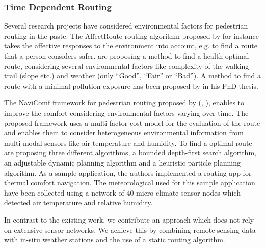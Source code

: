 \subsubsection{Time Dependent Routing}
Several research projects have considered environmental factors for pedestrian routing in the paste. The AffectRoute routing algorithm proposed by \textcite{Huang2014} for instance takes the affective responses to the environment into account, e.g. to find a route that a person considers safer.  \textcite{Sharker2012} are proposing a method to find a health optimal route, considering several environmental factors like complexity of the walking trail (slope etc.) and weather (only “Good”, “Fair” or “Bad”). A method to find a route with a minimal pollution exposure has been proposed by \textcite{Hasenfratz2015} in his PhD thesis.

The NaviComf framework for pedestrian routing proposed by \citeauthor{Dang2012} (\citeyear{Dang2012}, \citeyear{Dang2013}), enables to improve the comfort considering environmental factors varying over time. The proposed framework uses a multi-factor cost model for the evaluation of the route and enables them to consider heterogeneous environmental information from multi-modal
 sensors like air temperature and humidity. To find a optimal route \textcite{Dang2013} are proposing three different algorithms,  a bounded depth-first search algorithm, an adjustable dynamic planning algorithm and a heuristic particle planning algorithm. As a sample application, the authors implemented a routing app for thermal comfort navigation. The meteorological used for this sample application have been collected using a network of 40 micro-climate sensor nodes which detected air temperature and relative humidity. 

In contrast to the existing work, we contribute an approach which does not rely on extensive sensor networks. We achieve this by combining remote sensing data with in-situ weather stations and the use of a static routing algorithm.